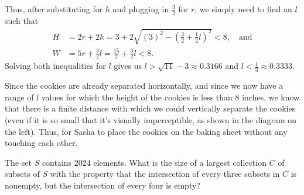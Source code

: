 \begin{solution}
\begin{minipage}[t]{0.28\linewidth}
\begin{tikzpicture}[scale=0.7]
    \end{tikzpicture}\end{minipage}\hfill
    \begin{minipage}[t]{0.7\linewidth}\vspace{0pt}
    Thus, after substituting for $h$ and plugging in $\frac{3}{2}$ for $r$, we simply need to find an $l$ such that
    \begin{align*}
        H &= 2r+2h=3+2\sqrt{(3)^2-\left(\tfrac{3}{2}+\tfrac{1}{2}l\right)^{2}}<8, \quad \text{and}\\
        W &= 5r+\frac{3}{2}l = \frac{15}{2} + \frac{3}{2}l < 8.
    \end{align*}
    Solving both inequalities for $l$ gives us $l>\sqrt{11}-3\approx0.3166$ and $l<\frac{1}{3}\approx0.3333$. 
    \end{minipage}\vspace{2pt}
    Since the cookies are already separated horizontally, and since we now have a range of $l$ values for which the height of the cookies is less than 8 inches, we know that there is a finite distance with which we could vertically separate the cookies (even if it is so small that it's visually imperceptible, as shown in the diagram on the left). Thus,  for Sasha to place the cookies on the baking sheet without any touching each other.
\end{solution}

\begin{problem}[C][3][MP4G 2024/14]
    The set $S$ contains $2024$ elements. What is the size of a largest collection $C$ of subsets of $S$ with the property that the intersection of every three subsets in $C$ is nonempty,
  but the intersection of every four is empty?
\end{problem}

